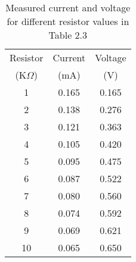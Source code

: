\begin{table}[H]
    \centering
    \begin{tabular}{ccc}
    \hline
    Resistor & Current & Voltage \\
    (K$\Omega$) & (mA) & (V) \\
    \hline
    1 & 0.165 & 0.165 \\
    2 & 0.138 & 0.276 \\
    3 & 0.121 & 0.363 \\
    4 & 0.105 & 0.420 \\
    5 & 0.095 & 0.475 \\
    6 & 0.087 & 0.522 \\
    7 & 0.080 & 0.560 \\
    8 & 0.074 & 0.592 \\
    9 & 0.069 & 0.621 \\
    10 & 0.065 & 0.650 \\
    \hline
    \end{tabular}
    \caption{Measured current and voltage for different resistor values in Table 2.3}
\end{table}
    